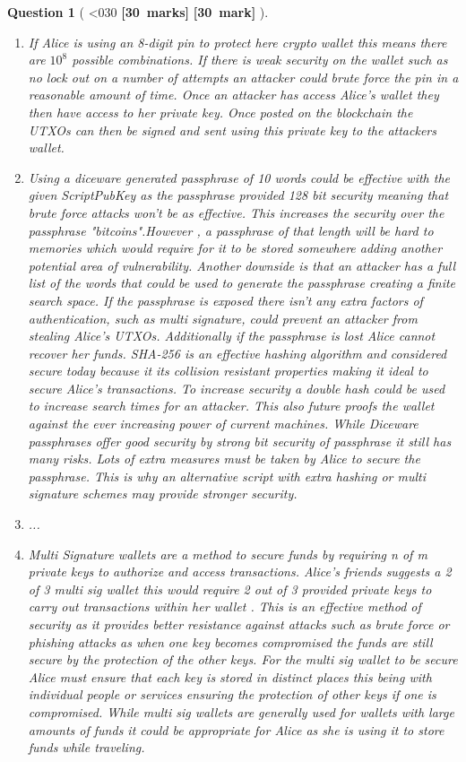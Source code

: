 \documentclass[a4paper]{article}
\theoremstyle{que}
\newtheorem{question}{Question}
\newcommand\points[1]{%
\ifnum1<0#1\relax%
    {\bf \small [#1~marks]}%
  \else%
    {\bf \small [#1~mark]}%
  \fi%
}%
\begin{document}
\begin{question}[\points{30}]
\begin{enumerate}[label=(\alph*)]
\begin{lstlisting}[basicstyle=\ttfamily, breaklines=true]
    Transaction is valid
\end{lstlisting}
    \item If Alice is using an 8-digit pin to protect here crypto wallet this means there are \( 10^8\) possible combinations. If there is weak security on the wallet such as no lock out on a number of attempts an attacker could brute force the pin in a reasonable amount of time. Once an attacker has access Alice's wallet they then have access to her private key. Once posted on the blockchain the UTXOs can then be signed and sent using this private key to the attackers wallet.
    \item Using a diceware generated passphrase of 10 words could be effective with the given ScriptPubKey as the passphrase provided 128 bit security \cite{antonov2020security} meaning that brute force attacks won't be as effective. This increases the security over the passphrase "bitcoins".However , a passphrase of that length will be hard to memories which would require for it to be stored somewhere adding another potential area of vulnerability. Another downside is that an attacker has a full list of the words that could be used to generate the passphrase creating a finite search space. If the passphrase is exposed there isn't any extra factors of authentication, such as multi signature, could prevent an attacker from stealing Alice's UTXOs. Additionally if the passphrase is lost Alice cannot recover her funds. SHA-256 is an effective hashing algorithm and considered secure today because it its collision resistant properties \cite{gilbert2003security} making it ideal to secure Alice's transactions. To increase security a double hash could be used to increase search times for an attacker. This also future proofs the wallet against the ever increasing power of current machines. While Diceware passphrases offer good security by strong bit security of passphrase it still has many risks. Lots of extra measures must be taken by Alice to secure the passphrase. This is why an alternative script with extra hashing or multi signature schemes may provide stronger security.
    \item...
    \item Multi Signature wallets are a method to secure funds by requiring n of m private keys to authorize and access transactions. Alice's friends suggests a 2 of 3 multi sig wallet this would require 2 out of 3 provided private keys to carry out transactions within her wallet \cite{coinbase_multisig_wallet}. This is an effective method of security as it provides better resistance against attacks such as brute force or phishing attacks as when one key becomes compromised the funds are still secure by the protection of the other keys. For the multi sig wallet to be secure Alice must ensure that each key is stored in distinct places this being with individual people or services ensuring the protection of other keys if one is compromised. While multi sig wallets are generally used for wallets with large amounts of funds it could be appropriate for Alice as she is using it to store funds while traveling.
    

\end{enumerate}
\end{question}
\end{document}
